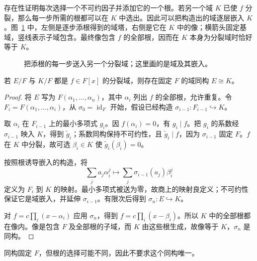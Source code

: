 \documentclass[lang=cn,a4paper,fontset=none,zihao=false,10pt,openany,twoside]{beautybook}
\numberwithin{algorithm}{chapter}
\begin{document}
\begin{remark}[逐层延伸嵌入]
存在性证明每次选择一个不可约因子并添加它的一个根。若另一个域 $K$ 已使 $f$ 分裂，那么每一步所需的根都可以在 $K$ 中选出。因此可以把构造出的域逐层嵌入 $K$。图~\ref{fig:splitting-uniqueness} 中，左侧是逐步添根得到的域塔，右侧是它在 $K$ 中的像；横箭头固定基域，竖线表示子域包含。最终像包含 $f$ 的全部根，因而在 $K$ 本身为分裂域时恰好等于 $K$。
\end{remark}
\begin{figure}[H]
\centering
{}
\caption{把添根的每一步送入另一个分裂域；这里画的是域及其嵌入。}
\label{fig:splitting-uniqueness}
\end{figure}
\begin{theorem}[分裂域的唯一性]\label{thm:splitting-unique}
若 $E/F$ 与 $K/F$ 都是 $f\in F[x]$ 的分裂域，则存在固定 $F$ 的域同构 $E\cong K$。
\end{theorem}
\begin{proof}
将 $E$ 写为 $F(\alpha_1,\ldots,\alpha_n)$，其中 $\alpha_i$ 列出 $f$ 的全部根，允许重复。令 $F_i=F(\alpha_1,\ldots,\alpha_i)$，从 $\sigma_0=\operatorname{id}_F$ 开始，假设已经构造 $\sigma_{i-1}:F_{i-1}\hookrightarrow K$。

取 $\alpha_i$ 在 $F_{i-1}$ 上的最小多项式 $g_i$。因 $f(\alpha_i)=0$，有 $g_i\mid f$。把 $g_i$ 的系数经 $\sigma_{i-1}$ 映入 $K$，得到 $\widetilde g_i$；系数同构保持不可约性，且 $\widetilde g_i\mid f$，因为 $\sigma_{i-1}$ 固定 $F$。$f$ 在 $K$ 中分裂，故可选 $\beta_i\in K$ 使 $\widetilde g_i(\beta_i)=0$。

按照根诱导嵌入的构造，将
\[
 \sum_j a_j\alpha_i^j\longmapsto\sum_j\sigma_{i-1}(a_j)\beta_i^j
\]
定义为 $F_i$ 到 $K$ 的映射。最小多项式被送为零，故商上的映射良定义；不可约性保证它是域嵌入，并延伸 $\sigma_{i-1}$。有限次后得到 $\sigma_n:E\hookrightarrow K$。

对 $f=c\prod_i(x-\alpha_i)$ 应用 $\sigma_n$，得到 $f=c\prod_i(x-\beta_i)$。所以 $K$ 中的全部根都在像内。像是包含 $F$ 及全部根的子域，而 $K$ 由这些根生成，故像等于 $K$，$\sigma_n$ 是同构。
\end{proof}
同构固定 $F$，但根的选择可能不同，因此不要求这个同构唯一。
\end{document}
